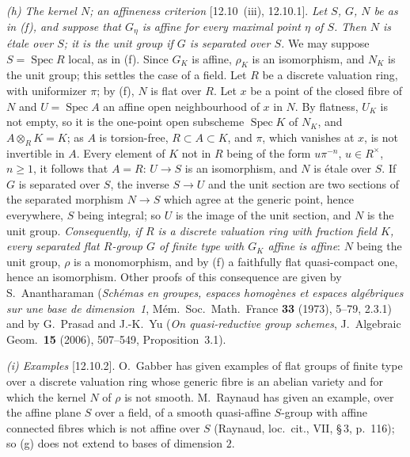\par\smallskip\noindent\textit{(h) The kernel \(N\); an affineness criterion} [12.10~(iii),
12.10.1]. \emph{Let \(S\), \(G\), \(N\) be as in \textup{(f)}, and suppose that \(G_\eta\) is
affine for every maximal point \(\eta\) of \(S\). Then \(N\) is \'etale over \(S\); it is the
unit group if \(G\) is separated over \(S\).} We may suppose \(S=\operatorname{Spec}R\) local,
as in (f). Since \(G_K\) is affine, \(\rho_K\) is an isomorphism, and \(N_K\) is the unit
group; this settles the case of a field. Let \(R\) be a discrete valuation ring, with
uniformizer \(\pi\); by (f), \(N\) is flat over \(R\). Let \(x\) be a point of the closed fibre
of \(N\) and \(U=\operatorname{Spec}A\) an affine open neighbourhood of \(x\) in \(N\). By
flatness, \(U_K\) is not empty, so it is the one-point open subscheme \(\operatorname{Spec}K\)
of \(N_K\), and \(A\otimes_RK=K\); as \(A\) is torsion-free, \(R\subset A\subset K\), and
\(\pi\), which vanishes at \(x\), is not invertible in \(A\). Every element of \(K\) not in
\(R\) being of the form \(u\pi^{-n}\), \(u\in R^\times\), \(n\geq1\), it follows that \(A=R\):
\(U\to S\) is an isomorphism, and \(N\) is \'etale over \(S\). If \(G\) is separated over \(S\),
the inverse \(S\to U\) and the unit section are two sections of the separated morphism
\(N\to S\) which agree at the generic point, hence everywhere, \(S\) being integral; so \(U\) is
the image of the unit section, and \(N\) is the unit group. \emph{Consequently, if \(R\) is a
discrete valuation ring with fraction field \(K\), every separated flat \(R\)-group \(G\) of
finite type with \(G_K\) affine is affine}: \(N\) being the unit group, \(\rho\) is a
monomorphism, and by (f) a faithfully flat quasi-compact one, hence an isomorphism. Other proofs of this consequence are given
by S.~Anantharaman (\emph{Sch\'emas en groupes, espaces homog\`enes et espaces alg\'ebriques
sur une base de dimension~1}, M\'em.\ Soc.\ Math.\ France \textbf{33} (1973), 5--79, 2.3.1)
and by G.~Prasad and J.-K.~Yu (\emph{On quasi-reductive group schemes}, J.\ Algebraic Geom.\
\textbf{15} (2006), 507--549, Proposition~3.1).

\par\smallskip\noindent\textit{(i) Examples} [12.10.2]. O.~Gabber has given examples of flat
groups of finite type over a discrete valuation ring whose generic fibre is an abelian variety
and for which the kernel \(N\) of \(\rho\) is not smooth. M.~Raynaud has given an example, over
the affine plane \(S\) over a field, of a smooth quasi-affine \(S\)-group with affine connected
fibres which is not affine over \(S\) (Raynaud, loc.\ cit., VII, \S\,3, p.~116); so (g) does
not extend to bases of dimension \(2\).


